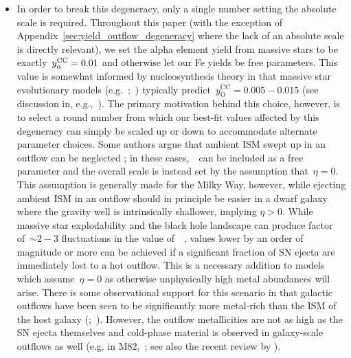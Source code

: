 \documentclass[ms.tex]{subfiles}
\begin{document}
\begin{itemize}
	\item In order to break this degeneracy, only a single number setting the
	absolute scale is required.
	Throughout this paper (with the exception of
	Appendix~\ref{sec:yield_outflow_degeneracy} where the lack of an absolute
	scale is directly relevant), we set the alpha element yield from massive
	stars to be exactly~$y_\alpha^\text{CC} = 0.01$ and otherwise let our Fe yields be
	free parameters.
	This value is somewhat informed by nucleosynthesis theory in that massive
	star evolutionary models (e.g.~\citealp*{Nomoto2013};~\citealp{Sukhbold2016,
	Limongi2018}) typically predict~$y_\text{O}^\text{CC} = 0.005 - 0.015$
	(see discussion in, e.g.,~\citealp{Weinberg2017, Johnson2020}).
	The primary motivation behind this choice, however, is to select a round
	number from which our best-fit values affected by this degeneracy can
	simply be scaled up or down to accommodate alternate parameter choices.
	Some authors argue that ambient ISM swept up in an outflow can be neglected
	\citep[e.g.][]{Spitoni2019, Spitoni2021}; in these cases,~\yacc~can
	be included as a free parameter and the overall scale is instead set by
	the assumption that~$\eta = 0$.
	This assumption is generally made for the Milky Way, however, while
	ejecting ambient ISM in an outflow should in principle be easier in a dwarf
	galaxy where the gravity well is intrinsically shallower, implying
	$\eta > 0$.
	While massive star explodability and the black hole landscape
	\citep[e.g.][]{Pejcha2015, Ertl2016, Sukhbold2016} can produce factor
	of~$\sim2 - 3$ fluctuations in the value of~\yacc~\citep{Griffith2021},
	values lower by an order of magnitude or more can be achieved if a
	significant fraction of SN ejecta are immediately lost to a hot outflow.
	This is a necessary addition to models which assume~$\eta = 0$ as otherwise
	unphysically high metal abundances will arise.
	There is some observational support for this scenario in that galactic
	outflows have been seen to be significantly more metal-rich than the ISM of
	the host galaxy (\citealp*{Chisholm2018};~\citealp{Cameron2021}).
	However, the outflow metallicities are not as high as the SN ejecta
	themselves and cold-phase material is observed in galaxy-scale outflows as
	well (e.g. in M82,~\citealp{Lopez2020}; see also the recent review by
	\citealp{Veilleux2020}).


\end{itemize}
\end{document}
